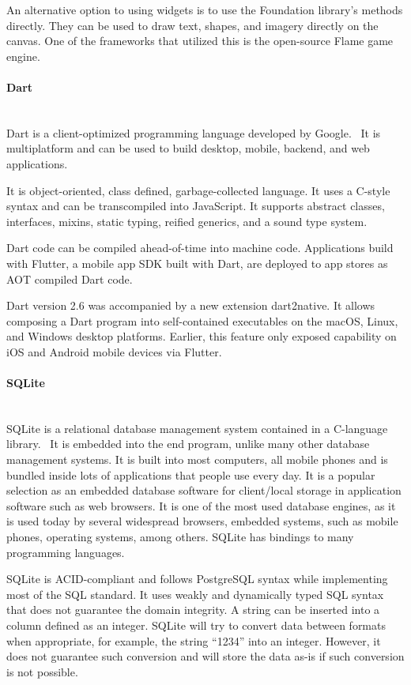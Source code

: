 An alternative option to using widgets is to use the Foundation library's methods directly. They can be used to draw text, shapes, and imagery directly on the canvas. One of the frameworks that utilized this is the open-source Flame game engine.

\paragraph{\large{Dart}}\mbox{}\\[2pt]
Dart is a client-optimized programming language developed by Google.~\cite{dart} It is multiplatform and can be used to build desktop, mobile, backend, and web applications.

It is object-oriented, class defined, garbage-collected language. It uses a C-style syntax and can be transcompiled into JavaScript. It supports abstract classes, interfaces, mixins, static typing, reified generics, and a sound type system.

Dart code can be compiled ahead-of-time into machine code. Applications build with Flutter, a mobile app SDK built with Dart, are deployed to app stores as AOT compiled Dart code.

Dart version 2.6 was accompanied by a new extension dart2native. It allows composing a Dart program into self-contained executables on the macOS, Linux, and Windows desktop platforms. Earlier, this feature only exposed capability on iOS and Android mobile devices via Flutter.~\cite{dart-wiki}

\paragraph{\large{SQLite}}\mbox{}\\[2pt]
SQLite is a relational database management system contained in a C-language library.~\cite{sqlite} It is embedded into the end program, unlike many other database management systems. It is built into most computers, all mobile phones and is bundled inside lots of applications that people use every day. It is a popular selection as an embedded database software for client/local storage in application software such as web browsers. It is one of the most used database engines, as it is used today by several widespread browsers, embedded systems, such as mobile phones, operating systems, among others. SQLite has bindings to many programming languages.

SQLite is ACID-compliant and follows PostgreSQL syntax while implementing most of the SQL standard. It uses weakly and dynamically typed SQL syntax that does not guarantee the domain integrity. A string can be inserted into a column defined as an integer. SQLite will try to convert data between formats when appropriate, for example, the string ``1234'' into an integer. However, it does not guarantee such conversion and will store the data as-is if such conversion is not possible.~\cite{sqlite-wiki}

